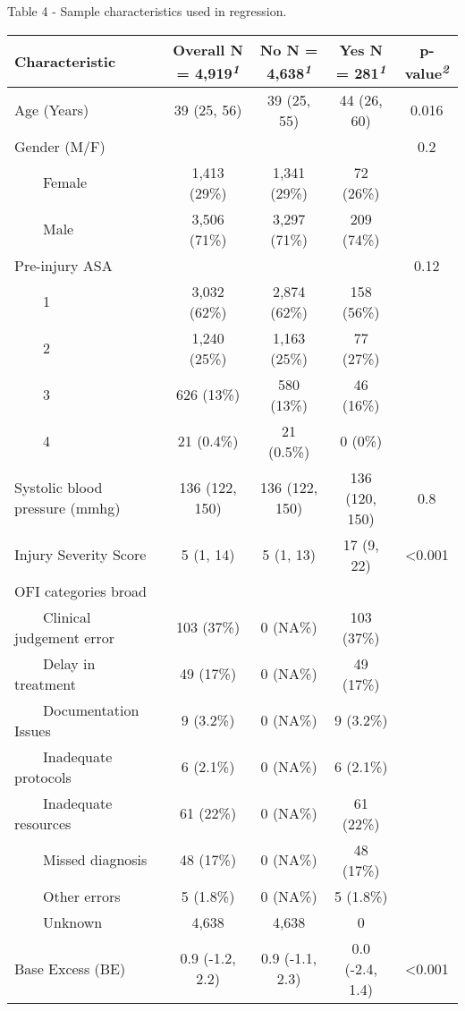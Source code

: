 \documentclass[
]{article}
\begin{document}
Table 4 - Sample characteristics used in regression.

\begin{table}[!t]
\fontsize{12.0pt}{14.4pt}\selectfont
\begin{tabular*}{\linewidth}{@{\extracolsep{\fill}}lcccc}
\toprule
\textbf{Characteristic} & \textbf{Overall}  N = 4,919\textsuperscript{\textit{1}} & \textbf{No}  N = 4,638\textsuperscript{\textit{1}} & \textbf{Yes}  N = 281\textsuperscript{\textit{1}} & \textbf{p-value}\textsuperscript{\textit{2}} \\ 
\midrule\addlinespace[2.5pt]
Age (Years) & 39 (25, 56) & 39 (25, 55) & 44 (26, 60) & 0.016 \\ 
Gender (M/F) &  &  &  & 0.2 \\ 
    Female & 1,413 (29\%) & 1,341 (29\%) & 72 (26\%) &  \\ 
    Male & 3,506 (71\%) & 3,297 (71\%) & 209 (74\%) &  \\ 
Pre-injury ASA &  &  &  & 0.12 \\ 
    1 & 3,032 (62\%) & 2,874 (62\%) & 158 (56\%) &  \\ 
    2 & 1,240 (25\%) & 1,163 (25\%) & 77 (27\%) &  \\ 
    3 & 626 (13\%) & 580 (13\%) & 46 (16\%) &  \\ 
    4 & 21 (0.4\%) & 21 (0.5\%) & 0 (0\%) &  \\ 
Systolic blood pressure (mmhg) & 136 (122, 150) & 136 (122, 150) & 136 (120, 150) & 0.8 \\ 
Injury Severity Score & 5 (1, 14) & 5 (1, 13) & 17 (9, 22) & <0.001 \\ 
OFI categories broad &  &  &  &  \\ 
    Clinical judgement error & 103 (37\%) & 0 (NA\%) & 103 (37\%) &  \\ 
    Delay in treatment & 49 (17\%) & 0 (NA\%) & 49 (17\%) &  \\ 
    Documentation Issues & 9 (3.2\%) & 0 (NA\%) & 9 (3.2\%) &  \\ 
    Inadequate protocols & 6 (2.1\%) & 0 (NA\%) & 6 (2.1\%) &  \\ 
    Inadequate resources & 61 (22\%) & 0 (NA\%) & 61 (22\%) &  \\ 
    Missed diagnosis & 48 (17\%) & 0 (NA\%) & 48 (17\%) &  \\ 
    Other errors & 5 (1.8\%) & 0 (NA\%) & 5 (1.8\%) &  \\ 
    Unknown & 4,638 & 4,638 & 0 &  \\ 
Base Excess (BE) & 0.9 (-1.2, 2.2) & 0.9 (-1.1, 2.3) & 0.0 (-2.4, 1.4) & <0.001 \\ 

\end{tabular*}
\end{table}
\end{document}
